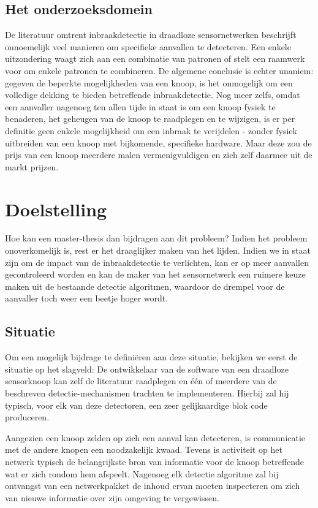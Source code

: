 \documentclass[12pt,a4paper,draft]{article}
\begin{document}
\subsection*{Het onderzoeksdomein}

De literatuur omtrent inbraakdetectie in draadloze sensornetwerken beschrijft
onnoemelijk veel manieren om specifieke aanvallen te detecteren. Een enkele
uitzondering waagt zich aan een combinatie van patronen of stelt een raamwerk
voor om enkele patronen te combineren. De algemene conclusie is echter unaniem:
gegeven de beperkte mogelijkheden van een knoop, is het onmogelijk om een
volledige dekking te bieden betreffende inbraakdetectie. Nog meer zelfs, omdat
een aanvaller nagenoeg ten allen tijde in staat is om een knoop fysiek te
benaderen, het geheugen van de knoop te raadplegen en te wijzigen, is er per
definitie geen enkele mogelijkheid om een inbraak te verijdelen - zonder fysiek
uitbreiden van een knoop met bijkomende, specifieke hardware. Maar deze zou de
prijs van een knoop meerdere malen vermenigvuldigen en zich zelf daarmee uit de
markt prijzen.

\section*{Doelstelling}

Hoe kan een master-thesis dan bijdragen aan dit probleem? Indien het probleem
onoverkomelijk is, rest er het draaglijker maken van het lijden. Indien we in
staat zijn om de impact van de inbraakdetectie te verlichten, kan er op meer
aanvallen gecontroleerd worden en kan de maker van het sensornetwerk een
ruimere keuze maken uit de bestaande detectie algoritmen, waardoor de drempel
voor de aanvaller toch weer een beetje hoger wordt.

\subsection*{Situatie}

Om een mogelijk bijdrage te defini\"eren aan deze situatie, bekijken we eerst
de situatie op het slagveld: De ontwikkelaar van de software van een draadloze
sensorknoop kan zelf de literatuur raadplegen en \'e\'en of meerdere van de
beschreven detectie-mechanismen trachten te implementeren. Hierbij zal hij
typisch, voor elk van deze detectoren, een zeer gelijkaardige blok code
produceren.

Aangezien een knoop zelden op zich een aanval kan detecteren, is communicatie
met de andere knopen een noodzakelijk kwaad. Tevens is activiteit op het
netwerk typisch de belangrijkste bron van informatie voor de knoop betreffende
wat er zich rondom hem afspeelt. Nagenoeg elk detectie algoritme zal bij
ontvangst van een netwerkpakket de inhoud ervan moeten inspecteren om zich van
nieuwe informatie over zijn omgeving te vergewissen.
\end{document}
